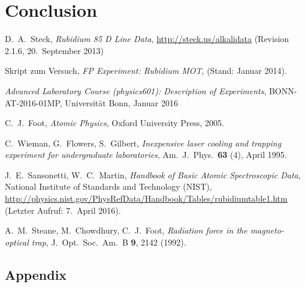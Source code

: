 \documentclass[11pt, a4paper]{article}
\numberwithin{equation}{section}
\begin{document}
\section{Conclusion}


\FloatBarrier
\vspace{\fill}
\begin{thebibliography}{19}
D.\ A.\ Steck,
\emph{Rubidium 85 D Line Data},
\url{http://steck.us/alkalidata} (Revision 2.1.6, 20.\ September 2013)

Skript zum Versuch,
\emph{FP Experiment: Rubidium MOT},
(Stand: Januar 2014).
	
	\emph{Advanced Laboratory Course (physics601): Description of Experiments}, BONN-AT-2016-01MP, Universität Bonn, Januar 2016
	
C.\ J.\ Foot,
\emph{Atomic Physics},
Oxford University Press, 2005.

	C.\ Wieman, G.\ Flowers, S.\ Gilbert,
	\emph{Inexpensive laser cooling and trapping experiment for undergraduate laboratories},
	Am.\ J.\ Phys.\ \textbf{63} (4), April 1995.

	J.\ E.\ Sansonetti, W.\ C.\ Martin,
	\emph{Handbook of Basic Atomic Spectroscopic Data},
	National Institute of Standards and Technology (NIST), \url{http://physics.nist.gov/PhysRefData/Handbook/Tables/rubidiumtable1.htm} (Letzter Aufruf: 7.\ April 2016).

	A.\ M.\ Steane, M.\ Chowdhury, C.\ J.\ Foot,
	\emph{Radiation force in the magneto-optical trap},
	J.\ Opt.\ Soc.\ Am.\ B \textbf{9}, 2142 (1992).
\end{thebibliography}

\begin{appendix}
\newpage
\section{Appendix}
\end{appendix}
\end{document}
